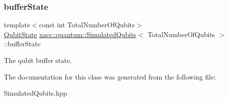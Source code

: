 \subsubsection{\texorpdfstring{buffer\+State}{bufferState}}
{\footnotesize\ttfamily template$<$const int Total\+Number\+Of\+Qubits$>$ \\
\hyperlink{a01812}{Qubit\+State} \hyperlink{a01248}{xacc\+::quantum\+::\+Simulated\+Qubits}$<$ Total\+Number\+Of\+Qubits $>$\+::buffer\+State\hspace{0.3cm}{\ttfamily [protected]}}

The qubit buffer state. 

The documentation for this class was generated from the following file\+:\begin{DoxyCompactItemize}
\item 
Simulated\+Qubits.\+hpp\end{DoxyCompactItemize}
